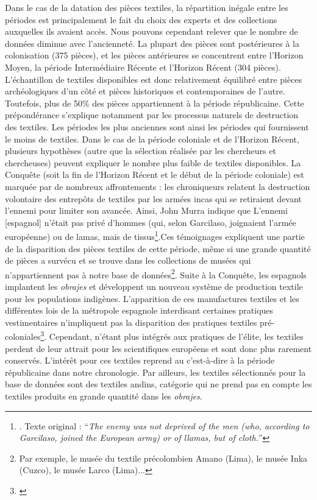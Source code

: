 Dans le cas de la datation des pièces textiles, la répartition inégale entre les périodes est principalement le fait du choix des experts et des collections auxquelles ils avaient accès. Nous pouvons cependant relever que le nombre de données diminue avec l'ancienneté. La plupart des pièces sont postérieures à la colonisation (375 pièces), et les pièces antérieures se concentrent entre l'Horizon Moyen, la période Intermédiaire Récente et l'Horizon Récent (304 pièces). L'échantillon de textiles disponibles est donc relativement équilibré entre pièces archéologiques d'un côté et pièces historiques et contemporaines de l'autre. Toutefois, plus de 50\% des pièces appartiennent à la période républicaine. Cette prépondérance s'explique notamment par les processus naturels de destruction des textiles. Les périodes les plus anciennes sont ainsi les périodes qui fournissent le moins de textiles.
Dans le cas de la période coloniale et de l'Horizon Récent, plusieurs hypothèses (autre que la sélection réalisée par les chercheurs et chercheuses) peuvent expliquer le nombre plus faible de textiles disponibles. La Conquête (soit la fin de l'Horizon Récent et le début de la période coloniale) est marquée par de nombreux affrontements : les chroniqueurs relatent la destruction volontaire des entrepôts de textiles par les armées incas qui se retiraient devant l'ennemi pour limiter son avancée. Ainsi, John Murra indique que \og L'ennemi [espagnol] n'était pas privé d'hommes (qui, selon Garcilaso, joignaient l'armée européenne) ou de lamas, mais de tissus\footnote{\cite[p.~718]{murraClothItsFunctions1962}. Texte original : \textquotedblleft \textit{The enemy was not deprived of the men (who, according to Garcilaso, joined the European army) or of llamas, but of cloth.}\textquotedblright}.\fg \:Ces témoignages expliquent une partie de la disparition des pièces textiles de cette période, même si une grande quantité de pièces a survécu et se trouve dans les collections de musées qui n'appartiennent pas à notre base de données\footnote{Par exemple, le musée du textile précolombien Amano (Lima), le musée Inka (Cuzco), le musée Larco (Lima)...}. Suite à la Conquête, les espagnols implantent les \textit{obrajes} et développent un nouveau système de production textile pour les populations indigènes. L'apparition de ces manufactures textiles et les différentes lois de la métropole espagnole interdisant certaines pratiques vestimentaires n'impliquent pas la disparition des pratiques textiles pré-coloniales\footnote{\cite[par.~3] {desrosiersLogicasTextilesLogicas1997}}. Cependant, n'étant plus intégrés aux pratiques de l'élite, les textiles perdent de leur attrait pour les scientifiques européens et sont donc plus rarement conservés. L'intérêt pour ces textiles reprend au  c'est-à-dire à la période républicaine dans notre chronologie. Par ailleurs, les textiles sélectionnés pour la base de données sont des textiles andins, catégorie qui ne prend pas en compte les textiles produits en grande quantité dans les \textit{obrajes}. 

